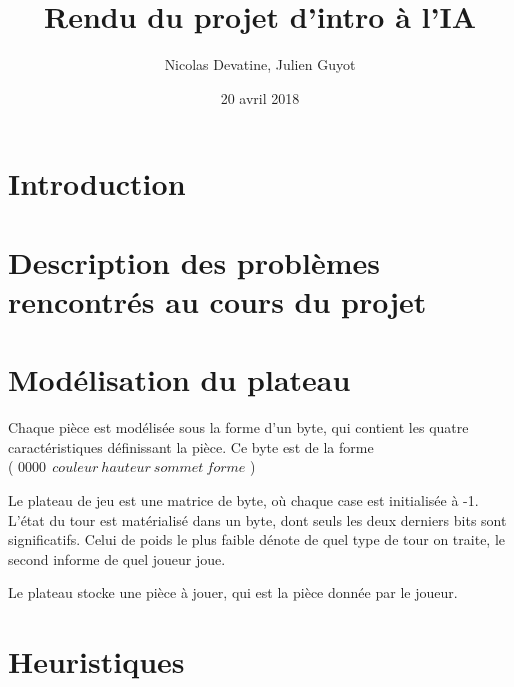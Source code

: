 \documentclass{article}
\author{Nicolas Devatine, Julien Guyot}
\title{Rendu du projet d'intro à l'IA}
\date{20 avril 2018}
\begin{document}
\maketitle
\section{Introduction}

\section{Description des problèmes rencontrés au cours du projet}


\section{Modélisation du plateau}
Chaque pièce est modélisée sous la forme d'un byte, qui contient les
quatre caractéristiques définissant la pièce. Ce byte est de la forme 
\\ ( \( 0000~~couleur~hauteur~sommet~forme \) ) 


Le plateau de jeu est une matrice de byte, o\`u chaque case est
initialisée à -1.
L'état du tour est matérialisé dans un byte, dont seuls les deux
derniers bits sont significatifs. Celui de poids le plus faible dénote de quel
type de tour on traite, le second informe de quel joueur joue.


Le plateau stocke une pièce à jouer, qui est la pièce donnée par le
joueur.




\section{Heuristiques}
\end{document}
